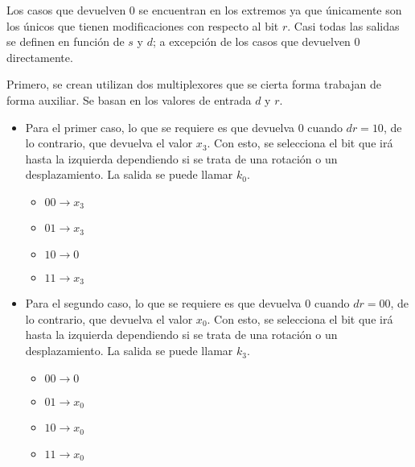 \documentclass[../procedimientos.tex]{subfiles}
\begin{document}
Los casos que devuelven $0$ se encuentran en los extremos ya que únicamente 
son los únicos que tienen modificaciones con respecto al bit $r$. Casi todas 
las salidas se definen en función de $s$ y $d$; a excepción de los casos que 
devuelven $0$ directamente.

Primero, se crean utilizan dos multiplexores que se cierta forma trabajan de 
forma auxiliar. Se basan en los valores de entrada $d$ y $r$.
\begin{itemize}
  \item Para el primer caso, lo que se requiere es que devuelva $0$ cuando 
    $dr=10$, de lo contrario, que devuelva el valor $x_3$. Con esto, se 
    selecciona el bit que irá hasta la izquierda dependiendo si se trata de 
    una rotación o un desplazamiento. La salida se puede llamar $k_0$.
    \begin{itemize}
      \item $00 \rightarrow x_3$
      \item $01 \rightarrow x_3$
      \item $10 \rightarrow 0$
      \item $11 \rightarrow x_3$
    \end{itemize}
  \item Para el segundo caso, lo que se requiere es que devuelva $0$ cuando 
    $dr=00$, de lo contrario, que devuelva el valor $x_0$. Con esto, se 
    selecciona el bit que irá hasta la izquierda dependiendo si se trata de 
    una rotación o un desplazamiento. La salida se puede llamar $k_3$.
    \begin{itemize}
      \item $00 \rightarrow 0$
      \item $01 \rightarrow x_0$
      \item $10 \rightarrow x_0$
      \item $11 \rightarrow x_0$
    \end{itemize}
\end{itemize}
\end{document}
